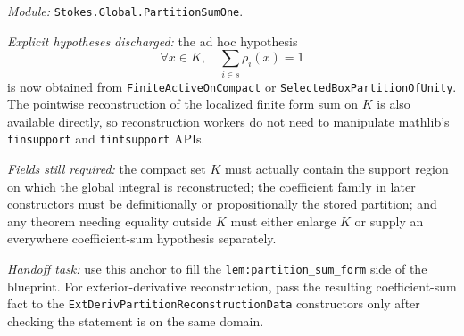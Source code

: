 \begin{definition}
  \label{anc:m6_partition_sum_one}
  \leanok
  \emph{Module:} \texttt{Stokes.Global.PartitionSumOne}.

  \emph{Explicit hypotheses discharged:}
  the ad hoc hypothesis
  \[
    \forall x \in K,\quad \sum_{i \in s} \rho_i(x)=1
  \]
  is now obtained from \texttt{FiniteActiveOnCompact} or
  \texttt{SelectedBoxPartitionOfUnity}.  The pointwise reconstruction of the
  localized finite form sum on \(K\) is also available directly, so
  reconstruction workers do not need to manipulate mathlib's
  \texttt{finsupport} and \texttt{fintsupport} APIs.

  \emph{Fields still required:}
  the compact set \(K\) must actually contain the support region on which the
  global integral is reconstructed; the coefficient family in later
  constructors must be definitionally or propositionally the stored partition;
  and any theorem needing equality outside \(K\) must either enlarge \(K\) or
  supply an everywhere coefficient-sum hypothesis separately.

  \emph{Handoff task:}
  use this anchor to fill the \texttt{lem:partition\_sum\_form} side of the
  blueprint.  For exterior-derivative reconstruction, pass the resulting
  coefficient-sum fact to the \texttt{ExtDerivPartitionReconstructionData}
  constructors only after checking the statement is on the same domain.
\end{definition}

